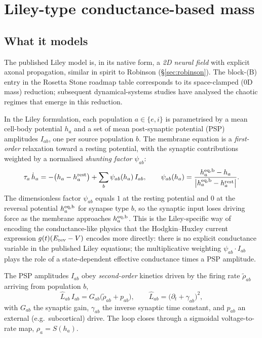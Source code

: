 \documentclass[11pt,a4paper]{article}
\begin{document}
\section{Liley-type conductance-based mass}
\label{sec:liley}

\subsection{What it models}

The published Liley model\cite{LileyCaduschWright1999,LileyCaduschDafilis2002} is, in its native form, a \emph{2D neural field} with explicit axonal propagation, similar in spirit to Robinson (\S\ref{sec:robinson}). The block-(B) entry in the Rosetta Stone roadmap table corresponds to its space-clamped (0D mass) reduction; subsequent dynamical-systems studies have analysed the chaotic regimes that emerge in this reduction\cite{Dafilis2013}.

In the Liley formulation, each population $a\in\{e,i\}$ is parametrised by a mean cell-body potential $h_a$ and a set of mean post-synaptic potential (PSP) amplitudes $I_{ab}$, one per source population $b$. The membrane equation is a \emph{first-order} relaxation toward a resting potential, with the synaptic contributions weighted by a normalised \emph{shunting factor} $\psi_{ab}$:
\begin{equation}
\label{eq:liley_membrane}
\tau_a\,\dot h_a = -\bigl(h_a - h_a^{\rm rest}\bigr) + \sum_b \psi_{ab}(h_a)\,I_{ab},
\qquad
\psi_{ab}(h_a) = \frac{h_a^{\rm eq,b} - h_a}{\bigl|h_a^{\rm eq,b} - h_a^{\rm rest}\bigr|}.
\end{equation}
The dimensionless factor $\psi_{ab}$ equals $1$ at the resting potential and $0$ at the reversal potential $h_a^{\rm eq,b}$ for synapse type $b$, so the synaptic input loses driving force as the membrane approaches $h_a^{\rm eq,b}$. This is the Liley-specific way of encoding the conductance-like physics that the Hodgkin--Huxley current expression $g(t)(E_{\rm rev}-V)$ encodes more directly: there is no explicit conductance variable in the published Liley equations; the multiplicative weighting $\psi_{ab}\cdot I_{ab}$ plays the role of a state-dependent effective conductance times a PSP amplitude.

The PSP amplitudes $I_{ab}$ obey \emph{second-order} kinetics driven by the firing rate $\tilde\rho_{ab}$ arriving from population $b$,
\begin{equation}
\label{eq:liley_synapse}
\hat L_{ab}\,I_{ab} = G_{ab}\bigl(\tilde\rho_{ab} + p_{ab}\bigr),
\qquad
\hat L_{ab} = \bigl(\partial_t + \gamma_{ab}\bigr)^2,
\end{equation}
with $G_{ab}$ the synaptic gain, $\gamma_{ab}$ the inverse synaptic time constant, and $p_{ab}$ an external (e.g.\ subcortical) drive. The loop closes through a sigmoidal voltage-to-rate map, $\rho_a = S(h_a)$.
\end{document}
